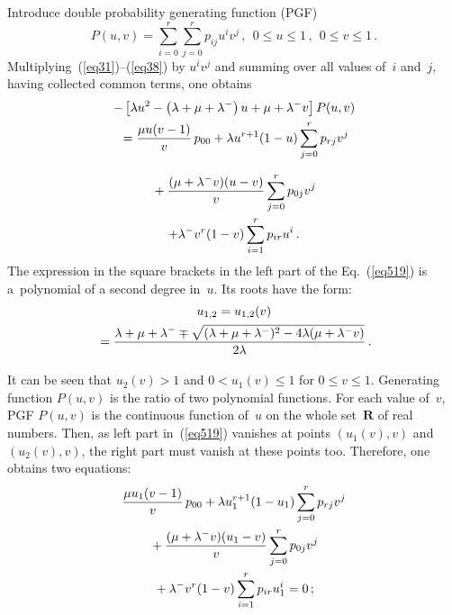 \begin{multicols}{2}
\noindent
Introduce double probability generating function (PGF)
\begin{equation*}
P(u,v) = \sum\limits_{i=0}^r \sum\limits_{j=0}^r p_{ij} u^i v^j\,,
\ \ 0 \le u \le 1\,, \ \ 0 \le v \le 1\,.
\end{equation*}
Multiplying~(\ref{eq31})--(\ref{eq38}) by $u^i v^j$ and summing over all
values of~$i$ and~$j$, having collected common terms, one obtains
\begin{multline*}
- \left[\lambda u^2 -\left(\lambda +\mu +\lambda^-\right) u + \mu + \lambda^- v \right] P(u,v)
\\
{}=\displaystyle\frac{\displaystyle \mu u (v-1)\mathstrut}{\displaystyle v\mathstrut}\, p_{00} + \lambda u^{r+1} (1-u) \sum\limits_{j=0}^{r} p_{rj} v^j
\end{multline*}

\noindent
\begin{multline}
{}+ \displaystyle\frac{\displaystyle (\mu + \lambda^- v)(u-v)\mathstrut}{\displaystyle v\mathstrut} \sum\limits_{j=0}^{r} p_{0j} v^j{}\\
+ \lambda^- v^r (1-v) \sum\limits_{i=1}^{r} p_{ir} u^i\,.
\label{eq519}
\end{multline}
The expression in the square brackets in the left part of the Eq.~(\ref{eq519})
is a~polynomial of a second degree in~$u$.
Its roots have the form: 
\begin{multline*}
u_{1,2} = u_{1,2} (v)\\
{}= \displaystyle\frac{\displaystyle \lambda + \mu + \lambda^- \mp
\sqrt{(\lambda + \mu + \lambda^-)^2 -
4\lambda (\mu + \lambda^- v)}\mathstrut}{\displaystyle 2 \lambda\mathstrut}\,.
\end{multline*}

It can be seen that $u_2(v)>1$ and $0<u_1(v) \le 1$ for $0 \le v \le 1$.
Generating function $P(u,v)$ is the ratio of two polynomial functions.
For each value of~$v$, PGF $P(u,v)$ is the continuous function of~$u$
on the whole set~$\mathbf{R}$ of real numbers.
Then, as left part in~(\ref{eq519})
vanishes at points $(u_1(v),v)$ and $(u_2(v),v)$,
the right part must vanish at these points too. Therefore, one obtains two equations:
\begin{multline}
\label{eq520}
\displaystyle\frac{\displaystyle \mu u_1 (v-1)\mathstrut}{\displaystyle v\mathstrut}\, p_{00} +
\lambda u_1^{r+1} (1-u_1) \sum\limits_{j=0}^{r} p_{rj} v^j 
{}\\
{}+
\displaystyle\frac{\displaystyle (\mu + \lambda^- v)(u_1-v)\mathstrut}{\displaystyle v\mathstrut} \sum\limits_{j=0}^{r} p_{0j} v^j \\
{}+
\lambda^- v^r (1-v) \sum\limits_{i=1}^{r} p_{ir} u_1^i = 0\,;
\end{multline}

\vspace*{-12pt}


\end{multicols}
